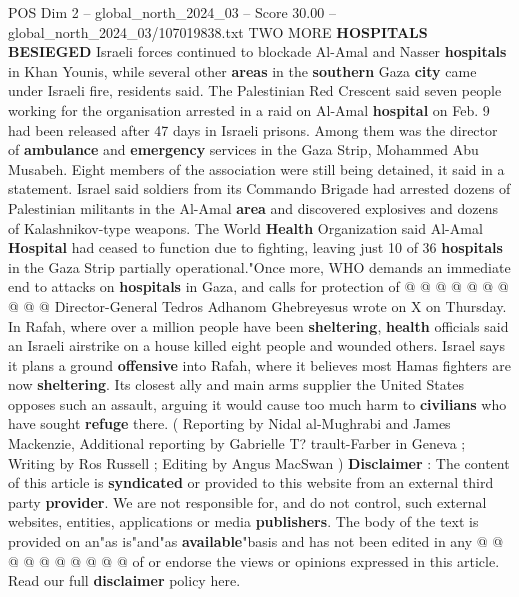 \begin{textsample}{POS Dim 2 – global\_north\_2024\_03 – Score 30.00 – global\_north\_2024\_03/107019838.txt}
TWO MORE \textbf{HOSPITALS} \textbf{BESIEGED} Israeli forces continued to blockade Al-Amal and Nasser \textbf{hospitals} in Khan Younis, while several other \textbf{areas} in the \textbf{southern} Gaza \textbf{city} came under Israeli fire, residents said.
The Palestinian Red Crescent said seven people working for the organisation arrested in a raid on Al-Amal \textbf{hospital} on Feb. 9 had been released after 47 days in Israeli prisons.
Among them was the director of \textbf{ambulance} and \textbf{emergency} services in the Gaza Strip, Mohammed Abu Musabeh.
Eight members of the association were still being detained, it said in a statement.
Israel said soldiers from its Commando Brigade had arrested dozens of Palestinian militants in the Al-Amal \textbf{area} and discovered explosives and dozens of Kalashnikov-type weapons.
The World \textbf{Health} Organization said Al-Amal \textbf{Hospital} had ceased to function due to fighting, leaving just 10 of 36 \textbf{hospitals} in the Gaza Strip partially operational."Once more, WHO demands an immediate end to attacks on \textbf{hospitals} in Gaza, and calls for protection of @ @ @ @ @ @ @ @ @ @ Director-General Tedros Adhanom Ghebreyesus wrote on X on Thursday.
In Rafah, where over a million people have been \textbf{sheltering}, \textbf{health} officials said an Israeli airstrike on a house killed eight people and wounded others.
Israel says it plans a ground \textbf{offensive} into Rafah, where it believes most Hamas fighters are now \textbf{sheltering}.
Its closest ally and main arms supplier the United States opposes such an assault, arguing it would cause too much harm to \textbf{civilians} who have sought \textbf{refuge} there. ( Reporting by Nidal al-Mughrabi and James Mackenzie, Additional reporting by Gabrielle T? trault-Farber in Geneva ; Writing by Ros Russell ; Editing by Angus MacSwan ) \textbf{Disclaimer} : The content of this article is \textbf{syndicated} or provided to this website from an external third party \textbf{provider}.
We are not responsible for, and do not control, such external websites, entities, applications or media \textbf{publishers}.
The body of the text is provided on an"as is"and"as \textbf{available}"basis and has not been edited in any @ @ @ @ @ @ @ @ @ @ of or endorse the views or opinions expressed in this article.
Read our full \textbf{disclaimer} policy here.

\end{textsample}

